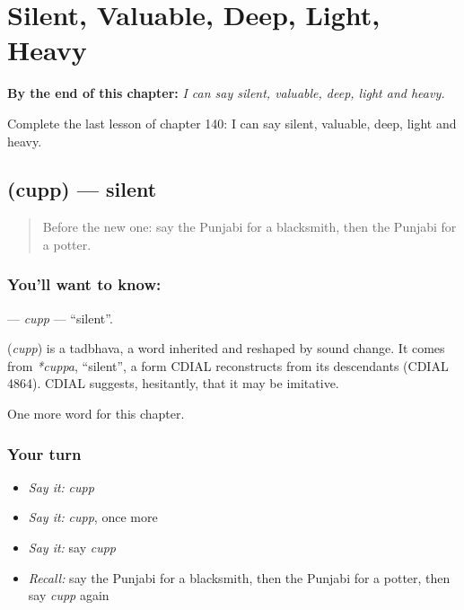 
\chapter{Silent, Valuable, Deep, Light, Heavy}
\label{ch:pa-silent-valuable-deep-light-heavy}

\begin{chapteropening}
\textbf{By the end of this chapter:} \emph{I can say silent, valuable, deep, light and heavy.}

Complete the last lesson of chapter 140: I can say silent, valuable, deep, light and heavy.
\end{chapteropening}

\section[\texorpdfstring{\pa{ਚੁੱਪ} (cupp)}{ਚੁੱਪ (cupp)}]{ (cupp) — silent}

\label{lesson:PA-C140-cupp}



\begin{quote}
Before the new one: say the Punjabi for a blacksmith, then the Punjabi for a potter.
\end{quote}

\subsection*{You'll want to know: }
\textbf{} — \emph{cupp} — \textquotedblleft{}silent\textquotedblright{}.

\begin{cousinweb}
\textbf{} (\emph{cupp}) is a tadbhava, a word inherited and reshaped by sound change. It comes from \emph{*cuppa}, \textquotedblleft{}silent\textquotedblright{}, a form CDIAL reconstructs from its descendants (CDIAL 4864). CDIAL suggests, hesitantly, that it may be imitative.
\end{cousinweb}

\begin{grammarlens}[title={What you've built}]
One more word for this chapter.
\end{grammarlens}

\subsection*{Your turn}
\begin{itemize}
\raggedright
  \item \emph{Say it:} \emph{cupp}
  \item \emph{Say it:} \emph{cupp}, once more
  \item \emph{Say it:} say \emph{cupp}
  \item \emph{Recall:} say the Punjabi for a blacksmith, then the Punjabi for a potter, then say \emph{cupp} again
\end{itemize}

